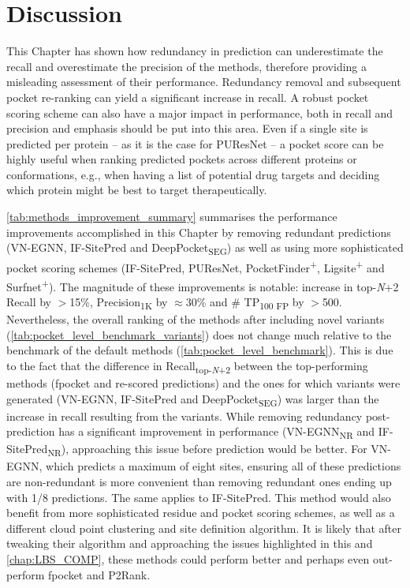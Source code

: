 \section{Discussion}

This Chapter has shown how redundancy in prediction can underestimate the recall and overestimate the precision of the methods, therefore providing a misleading assessment of their performance. Redundancy removal and subsequent pocket re-ranking can yield a significant increase in recall. A robust pocket scoring scheme can also have a major impact in performance, both in recall and precision and emphasis should be put into this area. Even if a single site is predicted per protein -- as it is the case for PUResNet -- a pocket score can be highly useful when ranking predicted pockets across different proteins or conformations, e.g., when having a list of potential drug targets and deciding which protein might be best to target therapeutically.

\autoref{tab:methods_improvement_summary} summarises the performance improvements accomplished in this Chapter by removing redundant predictions (VN-EGNN, IF-SitePred and DeepPocket\textsubscript{SEG}) as well as using more sophisticated pocket scoring schemes (IF-SitePred, PUResNet, PocketFinder\textsuperscript{+}, Ligsite\textsuperscript{+} and Surfnet\textsuperscript{+}). The magnitude of these improvements is notable: increase in top-\textit{N}+2 Recall by $>$15\%, Precision\textsubscript{1K} by $\approx$30\% and \# TP\textsubscript{100 FP} by $>$500. Nevertheless, the overall ranking of the methods after including novel variants (\autoref{tab:pocket_level_benchmark_variants}) does not change much relative to the benchmark of the default methods (\autoref{tab:pocket_level_benchmark}). This is due to the fact that the difference in Recall\textsubscript{top-\textit{N}+2} between the top-performing methods (fpocket and re-scored predictions) and the ones for which variants were generated (VN-EGNN, IF-SitePred and DeepPocket\textsubscript{SEG}) was larger than the increase in recall resulting from the variants. While removing redundancy post-prediction has a significant improvement in performance (VN-EGNN\textsubscript{NR} and IF-SitePred\textsubscript{NR}), approaching this issue before prediction would be better. For VN-EGNN, which predicts a maximum of eight sites, ensuring all of these predictions are non-redundant is more convenient than removing redundant ones ending up with 1/8 predictions. The same applies to IF-SitePred. This method would also benefit from more sophisticated residue and pocket scoring schemes, as well as a different cloud point clustering and site definition algorithm. It is likely that after tweaking their algorithm and approaching the issues highlighted in this and \autoref{chap:LBS_COMP}, these methods could perform better and perhaps even out-perform fpocket and P2Rank.

